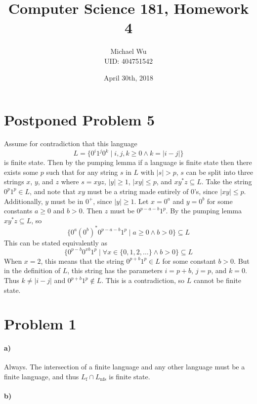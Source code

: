 \documentclass[12pt]{article}
\begin{document}
\title{Computer Science 181, Homework 4}
\date{April 30th, 2018}
\author{Michael Wu\\UID: 404751542}
\maketitle

\section*{Postponed Problem 5}

Assume for contradiction that this language
\[L=\{0^i1^j0^k\mid i,j,k\geq0 \wedge k=|i-j|\}\]
is finite state. Then by the pumping lemma if a language is finite state then there exists some \(p\) such that for any string \(s\) in
\(L\) with \(|s|>p\), \(s\) can be split into three strings \(x\), \(y\), and \(z\) where \(s=xyz\), \(|y|\geq 1\), \(|xy|\leq p\), and \(xy^*z\subseteq L\).
Take the string \(0^p1^p\in L\), and note that \(xy\) must be a string made entirely of \(0\)'s, since \(|xy|\leq p\). Additionally, \(y\) must be in \(0^+\),
since \(|y|\geq 1\). Let \(x=0^a\) and \(y=0^b\) for some constants \(a\geq 0\) and \(b>0\). Then \(z\) must be \(0^{p-a-b}1^p\). By the pumping lemma \(xy^*z\subseteq L\),
so
\[\{0^a(0^b)^*0^{p-a-b}1^p\mid a\geq0 \wedge b>0\}\subseteq L\]
This can be stated equivalently as
\[\{0^{p-b}0^{xb}1^p\mid\forall x\in\{0,1,2,\ldots\} \wedge b>0\}\subseteq L\]
When \(x=2\), this means that the string \(0^{p+b}1^p\in L\) for some constant \(b>0\). But in the definition of \(L\), this string has the parameters
\(i=p+b\), \(j=p\), and \(k=0\). Thus \(k\neq |i-j|\) and \(0^{p+b}1^p\notin L\). This is a contradiction, so \(L\) cannot be finite state.

\section*{Problem 1}

\paragraph{a)}

Always. The intersection
 of a finite language and any other language must be a finite language, and thus \(L_\text{f} \cap L_\text{nfs}\) is finite state.

\paragraph{b)}
\end{document}
